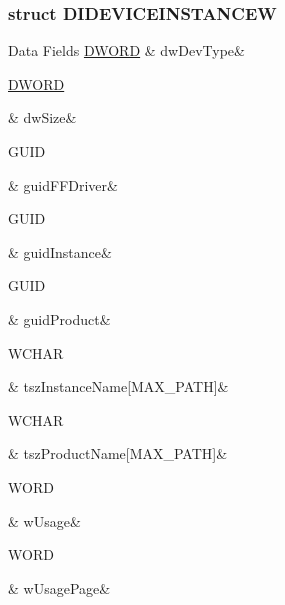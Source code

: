 \subsubsection{struct D\-I\-D\-E\-V\-I\-C\-E\-I\-N\-S\-T\-A\-N\-C\-E\-W}
\begin{DoxyFields}{Data Fields}
\hypertarget{a00003_a2bdaf065880c5cb7fa08be0bf17027a6}{\hyperlink{a00003_a50e15ae51c87ae06ab29c8148cb5f36c}{D\-W\-O\-R\-D}}\label{a00003_a2bdaf065880c5cb7fa08be0bf17027a6}
&
dw\-Dev\-Type&
\\
\hline

\hypertarget{a00003_a669c5a85f5a9eb97e64ad880fadaaa2d}{\hyperlink{a00003_a50e15ae51c87ae06ab29c8148cb5f36c}{D\-W\-O\-R\-D}}\label{a00003_a669c5a85f5a9eb97e64ad880fadaaa2d}
&
dw\-Size&
\\
\hline

\hypertarget{a00003_a62f782d9ced1e758acfba8f1dfe6906b}{G\-U\-I\-D}\label{a00003_a62f782d9ced1e758acfba8f1dfe6906b}
&
guid\-F\-F\-Driver&
\\
\hline

\hypertarget{a00003_a7fba3dbe50344a5643d4b3c3ae186576}{G\-U\-I\-D}\label{a00003_a7fba3dbe50344a5643d4b3c3ae186576}
&
guid\-Instance&
\\
\hline

\hypertarget{a00003_a30bf31754fdd016b11557bf6a75bfc87}{G\-U\-I\-D}\label{a00003_a30bf31754fdd016b11557bf6a75bfc87}
&
guid\-Product&
\\
\hline

\hypertarget{a00003_a5b995e3d8db75f43f25f02007bdfd7d9}{W\-C\-H\-A\-R}\label{a00003_a5b995e3d8db75f43f25f02007bdfd7d9}
&
tsz\-Instance\-Name\mbox{[}M\-A\-X\-\_\-\-P\-A\-T\-H\mbox{]}&
\\
\hline

\hypertarget{a00003_a0f804540b5c2e9c037fca76b898bcff7}{W\-C\-H\-A\-R}\label{a00003_a0f804540b5c2e9c037fca76b898bcff7}
&
tsz\-Product\-Name\mbox{[}M\-A\-X\-\_\-\-P\-A\-T\-H\mbox{]}&
\\
\hline

\hypertarget{a00003_a0d3e1ceaeb1960389350277978573941}{W\-O\-R\-D}\label{a00003_a0d3e1ceaeb1960389350277978573941}
&
w\-Usage&
\\
\hline

\hypertarget{a00003_ab55ab386802010c34f363f9a2615be89}{W\-O\-R\-D}\label{a00003_ab55ab386802010c34f363f9a2615be89}
&
w\-Usage\-Page&
\\
\hline

\end{DoxyFields}
\label{db/df8/a00076}
\hypertarget{a00003_db/df8/a00076}{}
